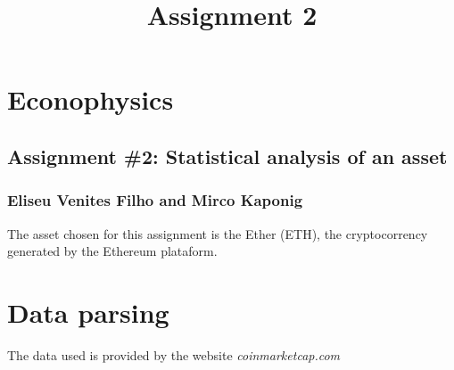\documentclass[11pt]{article}
\title{Assignment 2}
\begin{document}
    
    
    \maketitle
    
    

    
    \hypertarget{econophysics}{%
\section{Econophysics}\label{econophysics}}

\hypertarget{assignment-2-statistical-analysis-of-an-asset}{%
\subsection{Assignment \#2: Statistical analysis of an
asset}\label{assignment-2-statistical-analysis-of-an-asset}}

\hypertarget{eliseu-venites-filho-and-mirco-kaponig}{%
\subsubsection{Eliseu Venites Filho and Mirco
Kaponig}\label{eliseu-venites-filho-and-mirco-kaponig}}

The asset chosen for this assignment is the Ether (ETH), the
cryptocorrency generated by the Ethereum plataform.

    \hypertarget{data-parsing}{%
\section{Data parsing}\label{data-parsing}}

The data used is provided by the website \emph{coinmarketcap.com}
\end{document}
